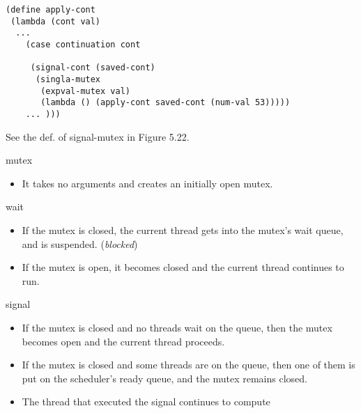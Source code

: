 \documentclass{article}
\begin{document}
\begin{huge}
\begin{lstlisting}
(define apply-cont
 (lambda (cont val)
  ...
    (case continuation cont
    
     (signal-cont (saved-cont)
      (singla-mutex
       (expval-mutex val)
       (lambda () (apply-cont saved-cont (num-val 53)))))
    ... )))
\end{lstlisting}
 
 See the def. of signal-mutex in Figure 5.22.
 
 
mutex
\begin{itemize}
\item It takes no arguments and creates an initially open mutex.
\end{itemize}

wait 
\begin{itemize}
\item If the mutex is closed, the current thread gets into the mutex's wait queue,
and is suspended. ({\it blocked})
\item If the mutex is open, it becomes closed and the current thread continues to run.
\end{itemize}


signal
\begin{itemize}
\item If the mutex is closed and no threads wait on the queue, then the mutex
becomes open and the current thread proceeds.
\item If the mutex is closed and some threads are on the queue, then one of them
is put on the scheduler's ready queue, and the mutex remains closed.
\item The thread that executed the signal continues to compute 
\end{itemize}


\end{huge} 
\end{document}
